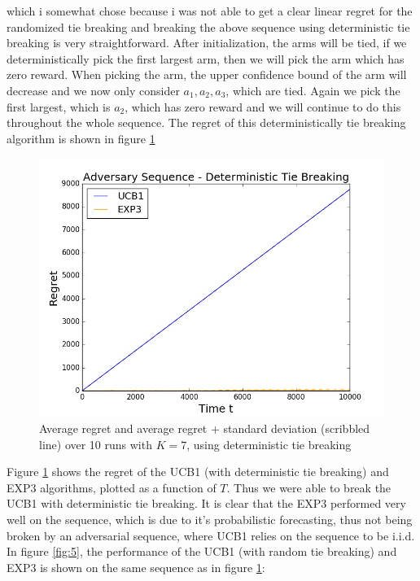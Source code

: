 \documentclass{article}
\begin{document}
which i somewhat chose because i was not able to get a clear linear regret for the randomized tie breaking and breaking the above sequence using deterministic tie breaking is very straightforward. After initialization, the arms will be tied, if we deterministically pick the first largest arm, then we will pick the arm which has zero reward. When picking the arm, the upper confidence bound of the arm will decrease and we now only consider $a_1,a_2,a_3$, which are tied. Again we pick the first largest, which is $a_2$, which has zero reward and we will continue to do this throughout the whole sequence. The regret of this deterministically tie breaking algorithm is shown in figure \ref{fig:4}
\begin{figure}[H]
 \centering  \includegraphics[width=15cm]{fig/newadvseq1.jpg}
  \caption{\footnotesize Average regret and average regret + standard deviation (scribbled line) over 10 runs with $K=7$, using deterministic tie breaking}
\label{fig:4}
\end{figure}
Figure \ref{fig:4} shows the regret of the UCB1 (with deterministic tie breaking) and EXP3 algorithms, plotted as a function of $T$. Thus we were able to break the UCB1 with deterministic tie breaking. It is clear that the EXP3 performed very well on the sequence, which is due to it's probabilistic forecasting, thus not being broken by an adversarial sequence, where UCB1 relies on the sequence to be i.i.d. In figure \ref{fig:5}, the performance of the UCB1 (with random tie breaking) and EXP3 is shown on the same sequence as in figure \ref{fig:4}:
\end{document}
